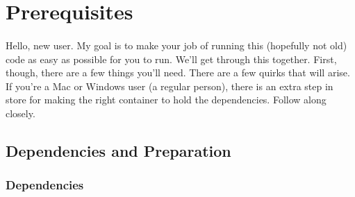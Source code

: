 \section{Prerequisites}
 \paragraph{}
 Hello, new user. My goal is to make your job of running this (hopefully not old) code as easy as possible for you to run. We'll get through this together. First, though, there are a few things you'll need. There are a few quirks that will arise. If you're a Mac or Windows user (a regular person), there is an extra step in store for making the right container to hold the dependencies. Follow along closely.

 \subsection{Dependencies and Preparation}
 \label{sec:dependencies}
 \subsubsection{Dependencies}
